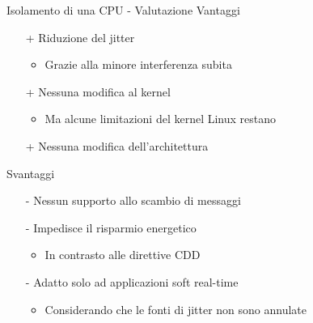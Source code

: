 \begin{frame}{Isolamento di una CPU - Valutazione}
	Vantaggi
	\begin{itemize}
		\item[+] Riduzione del jitter
		\begin{itemize}
			\item Grazie alla minore interferenza subita
		\end{itemize}
		\item[+] Nessuna modifica al kernel
		\begin{itemize}
			\item Ma alcune limitazioni del kernel Linux restano
		\end{itemize}
		\item[+] Nessuna modifica dell'architettura
	\end{itemize}
	\vspace{20px}
	Svantaggi
	\begin{itemize}
		\item[-] Nessun supporto allo scambio di messaggi
		\item[-] Impedisce il risparmio energetico
		\begin{itemize}
			\item In contrasto alle direttive CDD
		\end{itemize}
		\item[-] Adatto solo ad applicazioni soft real-time
		\begin{itemize}
			\item Considerando che le fonti di jitter non sono annulate
		\end{itemize}
	\end{itemize}
\end{frame}